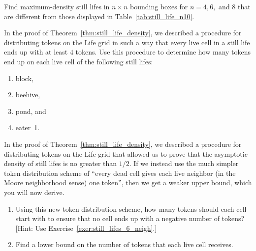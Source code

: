 \begin{multicols}{2}
	
	\mfilbreak
	
	
	\begin{problem}\label{exer:densest_still_lifes}
		Find maximum-density still lifes in $n \times n$ bounding boxes for $n = 4, 6,$ and $8$ that are different from those displayed in Table~\ref{tab:still_life_n10}.
	\end{problem}
	
	
	\mfilbreak
	
	
	\begin{problem}\label{exer:still_life_tokens}
		In the proof of Theorem~\ref{thm:still_life_density}, we described a procedure for distributing tokens on the Life grid in such a way that every live cell in a still life ends up with at least $4$ tokens. Use this procedure to determine how many tokens end up on each live cell of the following still lifes:\smallskip
		
		\begin{enumerate}[label=\bf\color{ocre}(\alph*)]
			\item block,
			
			\item beehive,
			
			\item pond, and
			
			\item eater~1.
		\end{enumerate}
	\end{problem}
	
	
	\mfilbreak
	
	
	\begin{problemstar}\label{exer:sl_density_611}
		In the proof of Theorem~\ref{thm:still_life_density}, we described a procedure for distributing tokens on the Life grid that allowed us to prove that the asymptotic density of still lifes is no greater than $1/2$. If we instead use the much simpler token distribution scheme of ``every dead cell gives each live neighbor (in the Moore neighborhood sense) one token'', then we get a weaker upper bound, which you will now derive.\smallskip
		
		\begin{enumerate}[label=\bf\color{ocre}(\alph*)]
			\item Using this new token distribution scheme, how many tokens should each cell start with to ensure that no cell ends up with a negative number of tokens? [Hint: Use Exercise~\ref{exer:still_lifes_6_neigh}.]
			
			\item Find a lower bound on the number of tokens that each live cell receives.
			

\end{enumerate}
\end{problemstar}
\end{multicols}
